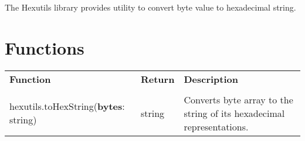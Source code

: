 The Hexutils library provides utility to convert byte value to hexadecimal string.

\section{Functions}

\begin{tabularx}{\textwidth}{l l X}
	\textbf{\large Function} & \textbf{\large Return} & \textbf{\large Description}
	\\ \\
	\endhead
	hexutils.toHexString(\textbf{bytes}: string) & string & Converts byte array to the string of its hexadecimal representations.
\end{tabularx}
